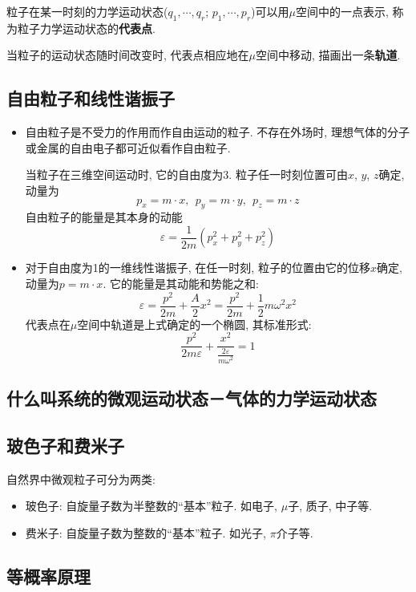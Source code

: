 粒子在某一时刻的力学运动状态($q_1,\cdots,q_r$;
$p_1,\cdots,p_r$)可以用$\mu$空间中的一点表示, 称为粒子力学运动状态的\textbf{代表点}.

当粒子的运动状态随时间改变时, 代表点相应地在$\mu$空间中移动, 描画出一条\textbf{轨道}.

\subsection{自由粒子和线性谐振子}

\begin{itemize}
    \item 自由粒子是不受力的作用而作自由运动的粒子. 不存在外场时, 理想气体的分子或金属的自由电子都可近似看作自由粒子.

          当粒子在三维空间运动时, 它的自由度为3. 粒子任一时刻位置可由$x$, $y$, $z$确定, 动量为
          $$
              p_x=m\cdot{x}, \ \ p_y=m\cdot{y}, \ \ p_z=m\cdot{z}
          $$
          自由粒子的能量是其本身的动能
          $$
              \varepsilon=\frac{1}{2m}(p_x^2+p_y^2+p_z^2)
          $$
    \item 对于自由度为1的一维线性谐振子, 在任一时刻, 粒子的位置由它的位移$x$确定, 动量为$p=m\cdot{x}$. 它的能量是其动能和势能之和:
          $$
              \varepsilon=\frac{p^2}{2m}+\frac{A}{2}x^2=\frac{p^2}{2m}+\frac{1}{2}m\omega^2x^2
          $$
          代表点在$\mu$空间中轨道是上式确定的一个椭圆, 其标准形式:
          $$
              \frac{p^2}{2m\varepsilon}+\frac{x^2}{\frac{2\varepsilon}{m\omega^2}}=1
          $$
\end{itemize}

\subsection{什么叫系统的微观运动状态－气体的力学运动状态}
\subsection{玻色子和费米子}
自然界中微观粒子可分为两类:
\begin{itemize}
    \item 玻色子: 自旋量子数为半整数的“基本”粒子. 如电子, $\mu$子, 质子, 中子等.
    \item 费米子: 自旋量子数为整数的“基本”粒子. 如光子, $\pi$介子等.
\end{itemize}

\subsection{等概率原理}

